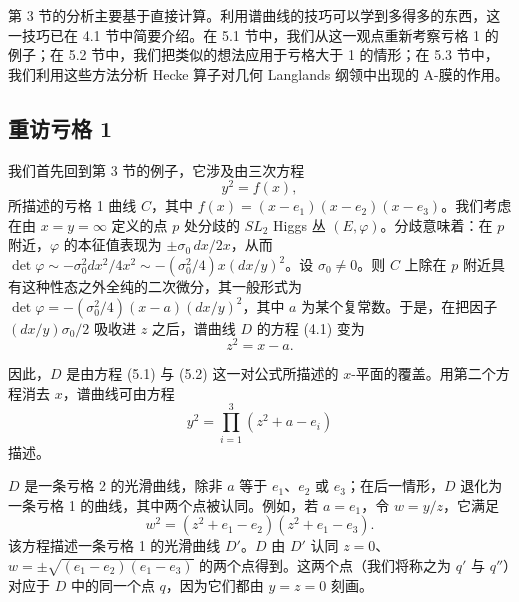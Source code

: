 \documentclass[11pt,a4paper]{article}
\begin{document}
第 3 节的分析主要基于直接计算。利用谱曲线的技巧可以学到多得多的东西，这一技巧已在 4.1 节中简要介绍。在 5.1 节中，我们从这一观点重新考察亏格 1 的例子；在 5.2 节中，我们把类似的想法应用于亏格大于 1 的情形；在 5.3 节中，我们利用这些方法分析 Hecke 算子对几何 Langlands 纲领中出现的 A-膜的作用。

\subsection{重访亏格 1}

我们首先回到第 3 节的例子，它涉及由三次方程
\begin{equation}\tag{5.1}
y^2 = f(x),
\end{equation}
所描述的亏格 1 曲线 $C$，其中 $f(x) = (x-e_1)(x-e_2)(x-e_3)$。我们考虑在由 $x=y=\infty$ 定义的点 $p$ 处分歧的 $SL_2$ Higgs 丛 $(E,\varphi)$。分歧意味着：在 $p$ 附近，$\varphi$ 的本征值表现为 $\pm\sigma_0\,dx/2x$，从而 $\det\varphi \sim -\sigma_0^2 dx^2/4x^2 \sim -(\sigma_0^2/4)x(dx/y)^2$。设 $\sigma_0\neq 0$。则 $C$ 上除在 $p$ 附近具有这种性态之外全纯的二次微分，其一般形式为 $\det\varphi = -(\sigma_0^2/4)(x-a)(dx/y)^2$，其中 $a$ 为某个复常数。于是，在把因子 $(dx/y)\sigma_0/2$ 吸收进 $z$ 之后，谱曲线 $D$ 的方程 (4.1) 变为
\begin{equation}\tag{5.2}
z^2 = x - a.
\end{equation}



因此，$D$ 是由方程 (5.1) 与 (5.2) 这一对公式所描述的 $x$-平面的覆盖。用第二个方程消去 $x$，谱曲线可由方程
\begin{equation}\tag{5.3}
y^2 = \prod_{i=1}^{3}(z^2+a-e_i)
\end{equation}
描述。

$D$ 是一条亏格 2 的光滑曲线，除非 $a$ 等于 $e_1$、$e_2$ 或 $e_3$；在后一情形，$D$ 退化为一条亏格 1 的曲线，其中两个点被认同。例如，若 $a=e_1$，令 $w=y/z$，它满足
\begin{equation}\tag{5.4}
w^2 = (z^2+e_1-e_2)(z^2+e_1-e_3).
\end{equation}
该方程描述一条亏格 1 的光滑曲线 $D'$。$D$ 由 $D'$ 认同 $z=0$、$w=\pm\sqrt{(e_1-e_2)(e_1-e_3)}$ 的两个点得到。这两个点（我们将称之为 $q'$ 与 $q''$）对应于 $D$ 中的同一个点 $q$，因为它们都由 $y=z=0$ 刻画。
\end{document}
